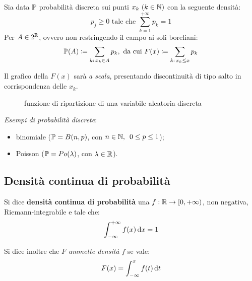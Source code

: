 \begin{ese}
  Sia data $\mathbb P$ probabilità discreta sui punti $x_k \ (k \in \mathbb N)$
  con la seguente densità:
  $$p_j \ge 0 \text{ tale che }\sum\limits_{k=1}^{+\infty} p_k = 1$$
  Per $A \in 2^\mathbb R$, ovvero non restringendo il campo ai soli boreliani:
  $$\mathbb P(A) \coloneqq \sum\limits_{k: \, x_k \in A} p_k, \text{ da cui } F(x) \coloneqq \sum\limits_{k: \, x_k \le x} p_k$$

  Il grafico della $F(x)$ sarà \textit{a scala}, presentando discontinuità di tipo salto
  in corrispondenza delle $x_k$.

  \begin{figure}[H]
  \centering

  \caption{funzione di ripartizione di una variabile aleatoria discreta}
  \end{figure}
\end{ese}

\textit{Esempi di probabilità discrete}:
\begin{itemize}
  \item binomiale ($\mathbb P = B(n, p)$, con
  $n \in \mathbb N, \enspace 0 \le p \le 1$);
  \item Poisson ($\mathbb P = Po(\lambda)$, con
  $\lambda \in \mathbb R$).
\end{itemize}

\subsection{Densità continua di probabilità}
\begin{defn}
  Si dice \textbf{densità continua di probabilità} una $f: \mathbb R \to [0, +\infty)$, non negativa, Riemann-integrabile e tale che:
  $$\int_{-\infty}^{+\infty} f(x) \, \mathrm d x = 1$$

  Si dice inoltre che \textit{$F$ ammette densità $f$} se vale:
  $$F(x) = \int_{-\infty}^{x} f(t) \, \mathrm d t$$
\end{defn}

